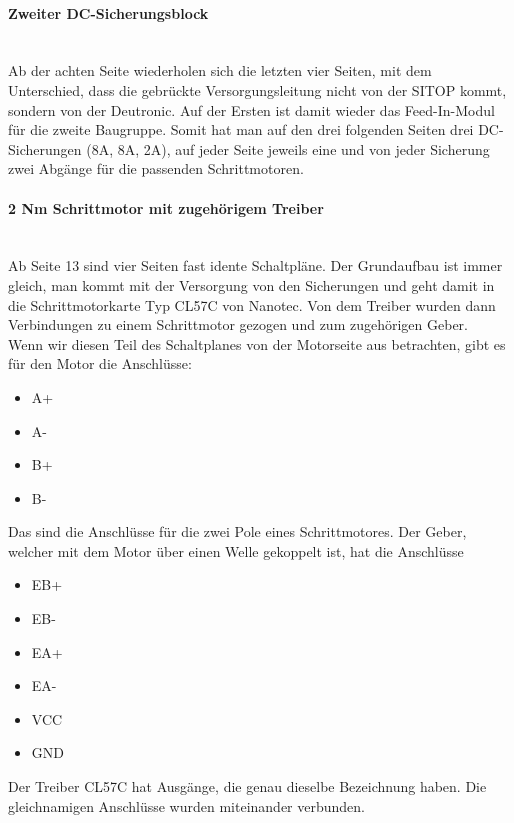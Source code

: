     \paragraph{Zweiter DC-Sicherungsblock}\mbox{}\\
    Ab der achten Seite wiederholen sich die letzten vier Seiten, mit dem Unterschied, dass die gebrückte Versorgungsleitung nicht von der SITOP kommt, sondern von der Deutronic. Auf der Ersten ist damit wieder das Feed-In-Modul für die zweite Baugruppe. Somit hat man auf den drei folgenden Seiten drei DC-Sicherungen (8A, 8A, 2A), auf jeder Seite jeweils eine und von jeder Sicherung zwei Abgänge für die passenden Schrittmotoren.
    \paragraph{2 Nm Schrittmotor mit zugehörigem Treiber}\mbox{}\\
    Ab Seite 13 sind vier Seiten fast idente Schaltpläne. Der Grundaufbau ist immer gleich, man kommt mit der Versorgung von den Sicherungen und geht damit in die Schrittmotorkarte Typ CL57C von Nanotec. Von dem Treiber wurden dann Verbindungen zu einem Schrittmotor gezogen und zum zugehörigen Geber.\\
    Wenn wir diesen Teil des Schaltplanes von der Motorseite aus betrachten, gibt es für den Motor die Anschlüsse:
    \begin{itemize}
        \item A+
        \item A-
        \item B+
        \item B-
    \end{itemize}
    Das sind die Anschlüsse für die zwei Pole eines Schrittmotores. Der Geber, welcher mit dem Motor über einen Welle gekoppelt ist, hat die Anschlüsse
    \begin{itemize}
        \item EB+
        \item EB-
        \item EA+
        \item EA-
        \item VCC
        \item GND
    \end{itemize}
    Der Treiber CL57C hat Ausgänge, die genau dieselbe Bezeichnung haben. Die gleichnamigen Anschlüsse wurden miteinander verbunden. \\\\
